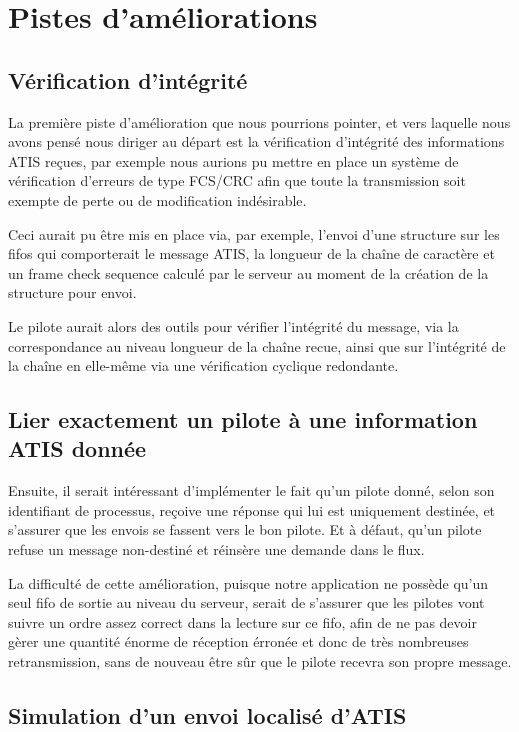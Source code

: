\documentclass{report}
\begin{document}
{	\section{Pistes d'améliorations}

		\subsection{Vérification d'intégrité}

			La première piste d'amélioration que nous pourrions pointer, et vers laquelle nous avons pensé nous diriger au départ est la vérification 
			d'intégrité des informations ATIS reçues, par exemple nous aurions pu mettre en place un système de vérification d'erreurs de type FCS/CRC
			afin que toute la transmission soit exempte de perte ou de modification indésirable.

			Ceci aurait pu être mis en place via, par exemple, l'envoi d'une structure sur les fifos qui comporterait le message ATIS, la longueur de la chaîne de caractère et un frame check sequence calculé par le serveur au moment de la création de la structure pour envoi.

			Le pilote aurait alors des outils pour vérifier l'intégrité du message, via la correspondance au niveau longueur de la chaîne recue, ainsi que sur l'intégrité de la chaîne en elle-même via une vérification cyclique redondante.
			
		\subsection{Lier exactement un pilote à une information ATIS donnée}

			Ensuite, il serait intéressant d'implémenter le fait qu'un pilote donné, selon son identifiant de processus, reçoive une réponse qui lui est uniquement destinée, et s'assurer que les envois se fassent vers le bon pilote. Et à défaut, qu'un pilote refuse un message non-destiné et réinsère une demande dans le flux.

			La difficulté de cette amélioration, puisque notre application ne possède qu'un seul fifo de sortie au niveau du serveur, serait de s'assurer que les pilotes vont suivre un ordre assez correct dans la lecture sur ce fifo, afin de ne pas devoir gèrer une quantité énorme de réception érronée et donc de très nombreuses retransmission, sans de nouveau être sûr que le pilote recevra son propre message.

		\subsection{Simulation d'un envoi localisé d'ATIS}

}
\end{document}
